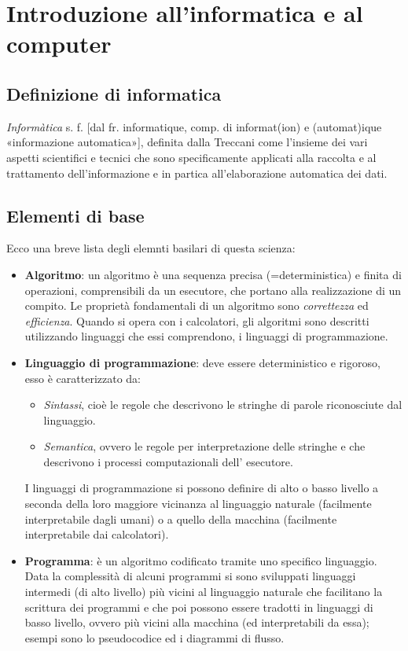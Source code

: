 \chapter{Introduzione all'informatica e al computer}
\section{Definizione di informatica}
\textit{Informàtica} s. f. [dal fr. informatique, comp. di informat(ion) e (automat)ique «informazione automatica»], definita dalla Treccani come l’insieme dei vari aspetti scientifici e tecnici che sono specificamente applicati alla raccolta e al trattamento dell’informazione e in partica all’elaborazione automatica dei dati.\\
\section{Elementi di base}
Ecco una breve lista degli elemnti basilari di questa scienza:
\begin{itemize}
	\item\textbf{Algoritmo}: un algoritmo è una sequenza precisa (=deterministica) e finita di operazioni, comprensibili da un esecutore, che portano alla realizzazione di un compito.
	Le proprietà fondamentali di un algoritmo sono \textit{correttezza} ed \textit{efficienza}. Quando si opera con i calcolatori, gli algoritmi sono descritti utilizzando linguaggi che essi comprendono, i linguaggi di programmazione. 

	\item\textbf{Linguaggio di programmazione}: deve essere deterministico e rigoroso, esso è caratterizzato da: 
	\begin{itemize}
	    \item\textit{Sintassi}, cioè le regole che descrivono le stringhe di parole riconosciute dal linguaggio.
	    \item\textit{Semantica}, ovvero le regole per interpretazione delle stringhe e che descrivono i processi computazionali dell’ esecutore.
	\end{itemize}
    I linguaggi di programmazione si possono definire di alto o basso livello a seconda della loro maggiore vicinanza al linguaggio naturale (facilmente interpretabile dagli umani) o a quello della macchina (facilmente interpretabile dai calcolatori).

	\item\textbf{Programma}: è un algoritmo codificato tramite uno specifico linguaggio. 
	Data la complessità di alcuni programmi si sono sviluppati linguaggi intermedi (di alto livello) più vicini al linguaggio naturale che facilitano la scrittura dei programmi e che poi possono essere tradotti in linguaggi di basso livello, ovvero più vicini alla macchina (ed interpretabili da essa); esempi sono lo pseudocodice ed i diagrammi di flusso.
\end{itemize}

\section{}


